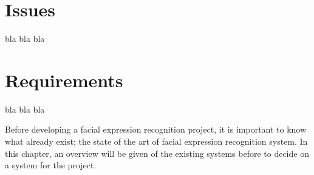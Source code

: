 \section{Issues}

\noindent bla bla bla
\newline

\section{Requirements}

\noindent bla bla bla
\newline









\noindent Before developing a facial expression recognition project, it is important to know what already exist; the state of the art of facial expression recognition system. In this chapter, an overview will be given of the existing systems before to decide on a system for the project.
\newline
